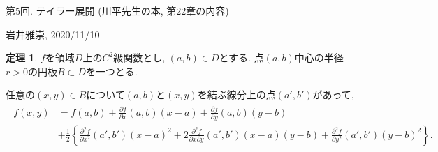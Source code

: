 \documentclass[dvipdfmx,a4paper,11pt]{article}
\theoremstyle{definition}
\newtheorem{thm}{定理}
\newcommand{\pdrv}[2]{\frac{\partial #1}{\partial #2}}
\newcommand{\ppdrv}[3]{\frac{\partial #1}{\partial #2 \partial #3}}
\begin{document}
\begin{center}
{\Large 第5回. テイラー展開 (川平先生の本, 第22章の内容)}
\end{center}

\begin{flushright}
 岩井雅崇, 2020/11/10
\end{flushright}


\begin{tcolorbox}[
    colback = white,
    colframe = green!35!black,
    fonttitle = \bfseries,
    breakable = true]
    \begin{thm}
    $f$を領域$D$上の$C^2$級関数とし, $(a,b)  \in D$とする.
    点$(a,b)$中心の半径$r>0$の円板$B \subset D$を一つとる.
    
    任意の$(x,y) \in B$について$(a,b)$と$(x,y) $を結ぶ線分上の点$(a',b')$があって,
  \begin{align*}
  \begin{split}
  f(x,y) &= f(a,b) + \pdrv{f}{x}(a,b)(x-a) + \pdrv{f}{y}(a,b)(y-b) \\
  &+ \frac{1}{2} \left\{  \pdrv{^2f}{x^2}(a',b')(x-a)^2 +2 \ppdrv{^2f}{x}{y}(a',b')(x-a)(y-b)+
   \pdrv{^2f}{y^2}(a',b')(y-b) ^2    \right\}.
    \end{split}
  \end{align*}

    \end{thm}
    \end{tcolorbox}
    
\end{document}
